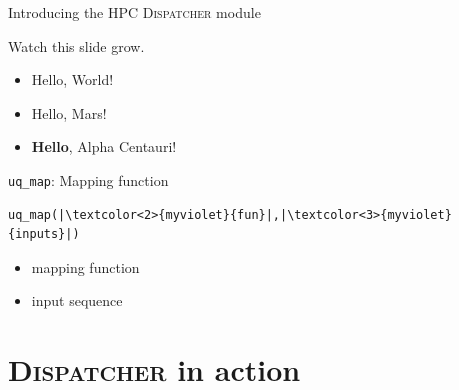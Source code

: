 \documentclass[]{rsuqbeamernew}
\begin{document}
\begin{frame}[fragile]{Introducing the HPC \textsc{Dispatcher} module}

Watch this slide grow.
\pause
\begin{itemize}
  \item<2-> Hello, World!
  \item<3-> Hello, Mars!
  \item<4-> \textbf<5->{Hello}, Alpha Centauri!
\end{itemize}
  
\end{frame}

\begin{frame}[fragile]{\texttt{uq\_map}: Mapping function}

\begin{lstlisting}
uq_map(|\textcolor<2>{myviolet}{fun}|,|\textcolor<3>{myviolet}{inputs}|)
\end{lstlisting}
\begin{itemize}
  \item \textcolor<2>{myviolet}{mapping function}
  \item \textcolor<3>{myviolet}{input sequence}
\end{itemize}

\end{frame}

\section{\textsc{Dispatcher} in action}
\end{document}
